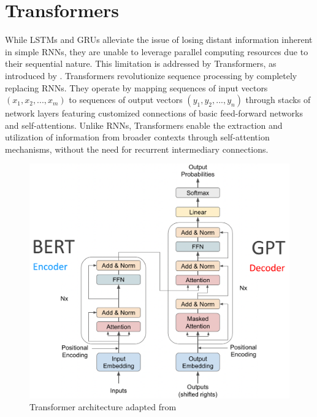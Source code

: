 \section{Transformers}\label{sec:transformers}
While LSTMs and GRUs alleviate the issue of losing distant information inherent in simple RNNs, they are unable to leverage parallel computing resources due to their sequential nature. 
This limitation is addressed by Transformers, as introduced by \cite{vaswani17}.
Transformers revolutionize sequence processing by completely replacing RNNs. 
They operate by mapping sequences of input vectors $(x_1, x_2, ..., x_m)$ to sequences of output vectors $(y_1, y_2, ..., y_n)$ through stacks of network layers featuring customized connections of basic feed-forward networks and self-attentions. 
Unlike RNNs, Transformers enable the extraction and utilization of information from broader contexts through self-attention mechanisms, without the need for recurrent intermediary connections.
\begin{figure}
	\centering
	\includegraphics[width=0.5\linewidth]{Figures/Transformer}
	\caption{Transformer architecture adapted from \cite{vaswani17}}
	\label{fig:transformer}
\end{figure}

